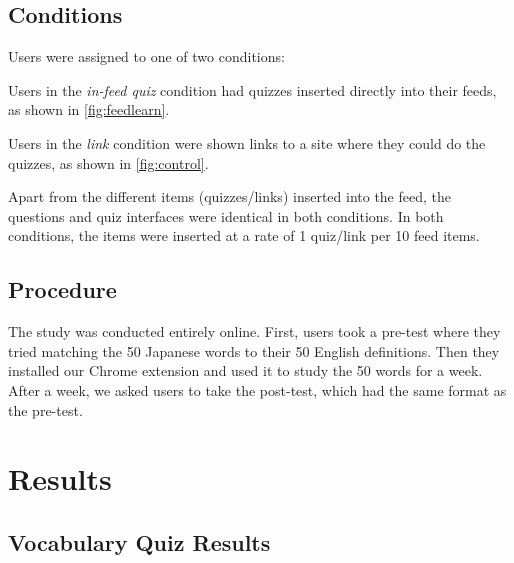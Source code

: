 \documentclass{sigchi}
\begin{document}
\subsection{Conditions}

Users were assigned to one of two conditions:

\begin{compactitem}
\item Users in the \textit{in-feed quiz} condition had quizzes inserted directly into their feeds, as shown in \autoref{fig:feedlearn}.
\item Users in the \textit{link} condition were shown links to a site where they could do the quizzes, as shown in \autoref{fig:control}.
\end{compactitem}

Apart from the different items (quizzes/links) inserted into the feed, the questions and quiz interfaces were identical in both conditions. In both conditions, the items were inserted at a rate of 1 quiz/link per 10 feed items. %


\subsection{Procedure}

The study was conducted entirely online. First, users took a pre-test where they tried matching the 50 Japanese words to their 50 English definitions. Then they installed our Chrome extension and used it to study the 50 words for a week. After a week, we asked users to take the post-test, which had the same format as the pre-test.


\section{Results}

\subsection{Vocabulary Quiz Results}
\end{document}

